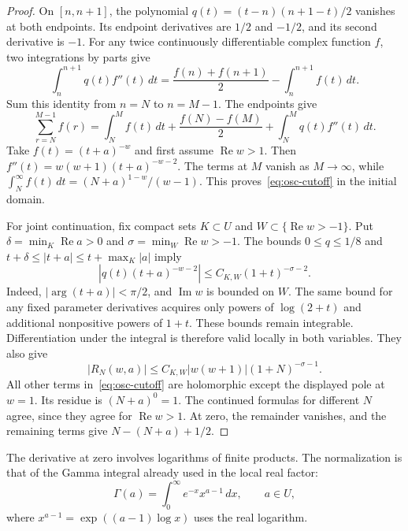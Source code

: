 \begin{proof}
On \([n,n+1]\), the polynomial \(q(t)=(t-n)(n+1-t)/2\)
vanishes at both endpoints. Its endpoint derivatives are \(1/2\) and
\(-1/2\), and its second derivative is \(-1\).
For any twice continuously differentiable complex function \(f\),
two integrations by parts give
\[
 \int_n^{n+1}q(t)f''(t)\,dt
 =\frac{f(n)+f(n+1)}2-\int_n^{n+1}f(t)\,dt.
\]
Sum this identity from \(n=N\) to \(n=M-1\). The endpoints give
\[
 \sum_{r=N}^{M-1}f(r)
 =\int_N^M f(t)\,dt+\frac{f(N)-f(M)}2
   +\int_N^M q(t)f''(t)\,dt.
\]
Take \(f(t)=(t+a)^{-w}\) and first assume \(\operatorname{Re}w>1\).
Then \(f''(t)=w(w+1)(t+a)^{-w-2}\).
The terms at \(M\) vanish as \(M\to\infty\), while
\(\int_N^\infty f(t)\,dt=(N+a)^{1-w}/(w-1)\).
This proves~\eqref{eq:osc-cutoff} in the initial domain.

For joint continuation, fix compact sets \(K\subset U\) and
\(W\subset\{\operatorname{Re}w>-1\}\).
Put \(\delta=\min_K\operatorname{Re}a>0\) and
\(\sigma=\min_W\operatorname{Re}w>-1\).
The bounds \(0\leq q\leq1/8\) and
\(t+\delta\leq|t+a|\leq t+\max_K|a|\) imply
\[
 |q(t)(t+a)^{-w-2}|
 \leq C_{K,W}(1+t)^{-\sigma-2}.
\]
Indeed, \(|\arg(t+a)|<\pi/2\), and \(\operatorname{Im}w\) is bounded
on \(W\). The same bound for any fixed parameter derivatives acquires
only powers of \(\log(2+t)\) and additional nonpositive powers of \(1+t\).
These bounds remain integrable. Differentiation under the integral is
therefore valid locally in both variables. They also give
\[
 |R_N(w,a)|\leq C_{K,W}|w(w+1)|(1+N)^{-\sigma-1}.
\]
All other terms in~\eqref{eq:osc-cutoff} are holomorphic except the displayed
pole at \(w=1\). Its residue is \((N+a)^0=1\).
The continued formulas for different \(N\) agree, since they agree for
\(\operatorname{Re}w>1\). At zero, the remainder vanishes, and the
remaining terms give \(N-(N+a)+1/2\).
\end{proof}

The derivative at zero involves logarithms of finite products.
The normalization is that of the Gamma integral already used in the
local real factor:
\begin{equation}
 \Gamma(a)=\int_0^\infty e^{-x}x^{a-1}\,dx,
 \qquad a\in U,                                   \label{eq:osc-gamma-integral}
\end{equation}
where \(x^{a-1}=\exp((a-1)\log x)\) uses the real logarithm.

